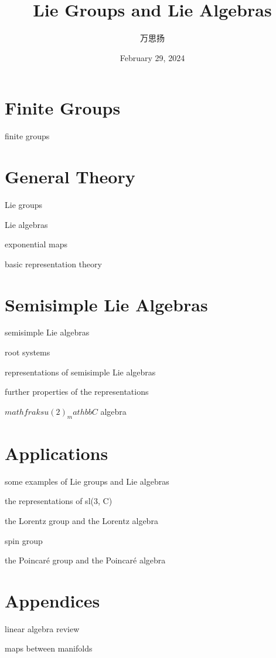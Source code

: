 \documentclass[10pt, a4paper]{report}
\title{\Huge \textbf{Lie Groups and Lie Algebras}}
\author{万思扬}
\date{February 29, 2024}
\numberwithin{equation}{section}
\begin{document}
	\maketitle
	
	\tableofcontents
	
	\part{Finite Groups}
	
	{finite groups}
	
	\part{General Theory}
	
	{Lie groups}
	
	{Lie algebras}
	
	{exponential maps}
	
	{basic representation theory}
	
	\part{Semisimple Lie Algebras}
	
	{semisimple Lie algebras}
	
	{root systems}
	
	{representations of semisimple Lie algebras}
	
	{further properties of the representations}
	
	{$mathfrak{su}(2)_mathbb{C}$ algebra}
	
	\part{Applications}
	
	{some examples of Lie groups and Lie algebras}
	
	{the representations of sl(3, C)}
	
	{the Lorentz group and the Lorentz algebra}
	
	{spin group}
	
	{the Poincaré group and the Poincaré algebra}
	
	\appendix
	
	\part*{Appendices}
	
	{linear algebra review}
	
	{maps between manifolds}
\end{document}
